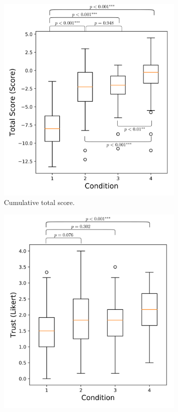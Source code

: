 \begin{figure}[tbp]
\begin{subfigure}[b]{0.30\linewidth}
        \includegraphics[width=1.0\linewidth]{Figures/total_score_box.png}
        \caption{Cumulative total score.}
        \label{fig:score_box}
    \end{subfigure} 
    \hfill
    \begin{subfigure}[b]{0.30\linewidth}
        \centering
        \includegraphics[width=1.0\linewidth]{Figures/trust_box.png}

\end{subfigure}
\end{figure}
